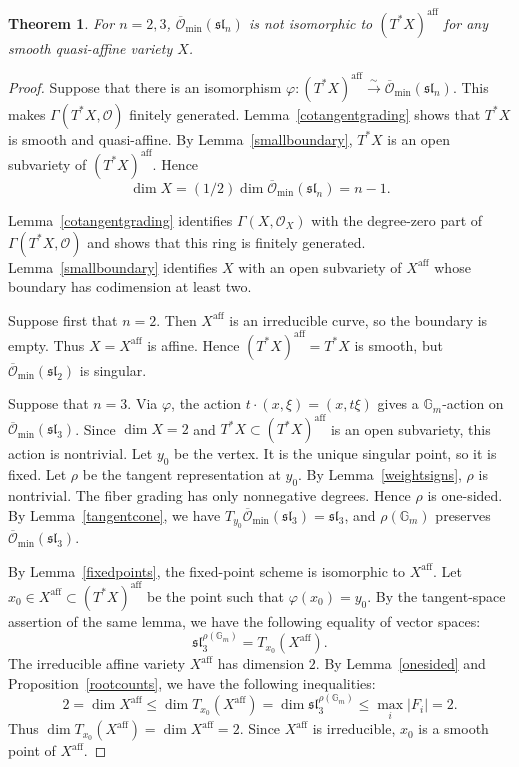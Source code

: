 \documentclass[12pt]{article}
\newtheorem{theorem}{Theorem}[section]
\theoremstyle{definition}
\newcommand{\Gm}{\mathbb G_m}
\newcommand{\OO}{\mathcal O}
\newcommand{\Ominbar}{\overline{\mathcal O}_{\min}}
\newcommand{\aff}{\mathrm{aff}}
\begin{document}
\begin{theorem}\label{smalltypes}
    For $n=2,3$, $\Ominbar(\mathfrak{sl}_n)$ is not isomorphic to $(T^*X)^\aff$ for any smooth quasi-affine variety $X$.
\end{theorem}
\begin{proof}
    Suppose that there is an isomorphism $\varphi:(T^*X)^\aff\xrightarrow{\sim}\Ominbar(\mathfrak{sl}_n)$. This makes $\Gamma(T^*X,\OO)$ finitely generated. Lemma~\ref{cotangentgrading} shows that $T^*X$ is smooth and quasi-affine. By Lemma~\ref{smallboundary}, $T^*X$ is an open subvariety of $(T^*X)^\aff$. Hence $$\dim X=(1/2)\dim \Ominbar(\mathfrak{sl}_n)=n-1.$$

    Lemma~\ref{cotangentgrading} identifies $\Gamma(X,\OO_X)$ with the degree-zero part of $\Gamma(T^*X,\OO)$ and shows that this ring is finitely generated. Lemma~\ref{smallboundary} identifies $X$ with an open subvariety of $X^\aff$ whose boundary has codimension at least two.

    Suppose first that $n=2$. Then $X^\aff$ is an irreducible curve, so the boundary is empty. Thus $X=X^\aff$ is affine. Hence $(T^*X)^\aff=T^*X$ is smooth, but $\Ominbar(\mathfrak{sl}_2)$ is singular.

    Suppose that $n=3$. Via $\varphi$, the action $t\cdot(x,\xi)=(x,t\xi)$ gives a $\Gm$-action on $\Ominbar(\mathfrak{sl}_3)$. Since $\dim X=2$ and $T^*X\subset(T^*X)^\aff$ is an open subvariety, this action is nontrivial. Let $y_0$ be the vertex. It is the unique singular point, so it is fixed. Let $\rho$ be the tangent representation at $y_0$. By Lemma~\ref{weightsigns}, $\rho$ is nontrivial. The fiber grading has only nonnegative degrees. Hence $\rho$ is one-sided. By Lemma~\ref{tangentcone}, we have $T_{y_0}\Ominbar(\mathfrak{sl}_3)=\mathfrak{sl}_3$, and $\rho(\Gm)$ preserves $\Ominbar(\mathfrak{sl}_3)$.

    By Lemma~\ref{fixedpoints}, the fixed-point scheme is isomorphic to $X^\aff$. Let $x_0\in X^\aff\subset(T^*X)^\aff$ be the point such that $\varphi(x_0)=y_0$. By the tangent-space assertion of the same lemma, we have the following equality of vector spaces:
    \[
        \mathfrak{sl}_3^{\rho(\Gm)}=T_{x_0}(X^\aff).
    \]
    The irreducible affine variety $X^\aff$ has dimension $2$. By Lemma~\ref{onesided} and Proposition~\ref{rootcounts}, we have the following inequalities:
    \[
        2=\dim X^\aff\le\dim T_{x_0}(X^\aff)
        =\dim\mathfrak{sl}_3^{\rho(\Gm)}
        \le\max_i|F_i|=2.
    \]
    Thus $\dim T_{x_0}(X^\aff)=\dim X^\aff=2$. Since $X^\aff$ is irreducible, $x_0$ is a smooth point of $X^\aff$.


\end{proof}
\end{document}
